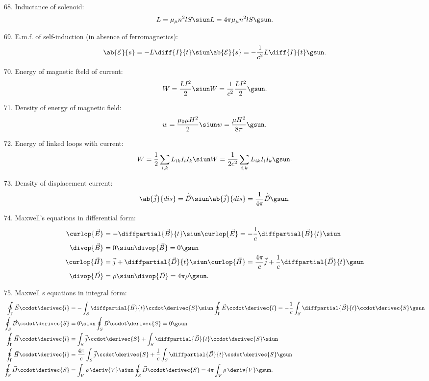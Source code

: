 68. Inductance of solenoid:
\begin{equation*}
	L = \mu_\mu n^2l S \siun L = 4\pi\mu_\mu n^2l S \gsun.
\end{equation*}

69. E.m.f. of self-induction (in absence of ferromagnetics):
\begin{equation*}
	\ab{\mathcal{E}}{s}=-L\diff{I}{t} \siun \ab{\mathcal{E}}{s}=-\frac{1}{c^2}L\diff{I}{t} \gsun.
\end{equation*}

70. Energy of magnetic fteld of current:
\begin{equation*}
	W=\frac{LI^2}{2} \siun W=\frac{1}{c^2}\frac{LI^2}{2} \gsun.
\end{equation*}

71. Density of energy of magnetic field:
\begin{equation*}
	w=\frac{\mu_0\mu H^2}{2} \siun w=\frac{\mu H^2}{8\pi} \gsun.
\end{equation*}

72. Energy of linked loops with current:
\begin{equation*}
	W = \frac{1}{2} \sum_{i,k} L_{ik} I_i I_k \siun W = \frac{1}{2c^2} \sum_{i,k} L_{ik} I_i I_k \gsun.
\end{equation*}

73. Density of displacement current:
\begin{equation*}
	\ab{\vec{j}}{dis} = \dot{\vec{D}} \siun \ab{\vec{j}}{dis} = \frac{1}{4\pi}\dot{\vec{D}} \gsun.
\end{equation*}

74. Maxwell's equations in differential form:
\begin{align*}
	\curlop{\vec{E}}&=-\diffpartial{\vec{B}}{t}\siun \curlop{\vec{E}}=-\frac{1}{c}\diffpartial{\vec{B}}{t}\siun\\
	\divop{\vec{B}}&=0\siun  \divop{\vec{B}}=0\gsun\\
	\curlop{\vec{H}}&=\vec{j}+\diffpartial{\vec{D}}{t} \siun \curlop{\vec{H}}=\frac{4\pi}{c}\vec{j}+\frac{1}{c}\diffpartial{\vec{D}}{t} \gsun\\
	\divop{\vec{D}}&=\rho \siun \divop{\vec{D}}=4\pi\rho \gsun.
\end{align*}

75. Maxwell s equations in integral form:
\begin{align*}
	\oint_{\Gamma}\vec{E}\ccdot\derivec{l}&=-\int_S\diffpartial{\vec{B}}{t}\ccdot\derivec{S} \siun \oint_{\Gamma}\vec{E}\ccdot\derivec{l}=-\frac{1}{c}\int_S\diffpartial{\vec{B}}{t}\ccdot\derivec{S} \gsun \\
	\oint_S\vec{B}\ccdot\derivec{S}&=0 \siun \oint_S\vec{B}\ccdot\derivec{S}=0 \gsun\\
	\oint_{\Gamma}\vec{H}\ccdot\derivec{l}&=\int_S\vec{j}\ccdot\derivec{S}+\int_S\diffpartial{\vec{D}}{t}\ccdot\derivec{S} \siun \\ \oint_{\Gamma}\vec{H}\ccdot\derivec{l}&=\frac{4\pi}{c}\int_S\vec{j}\ccdot\derivec{S}+\frac{1}{c}\int_S\diffpartial{\vec{D}}{t}\ccdot\derivec{S} \gsun\\
	\oint_S \vec{D}\ccdot\derivec{S}&=\int_V\rho\,\deriv{V} \siun \oint_S \vec{D}\ccdot\derivec{S}=4\pi\int_V\rho\,\deriv{V} \gsun.
\end{align*}

